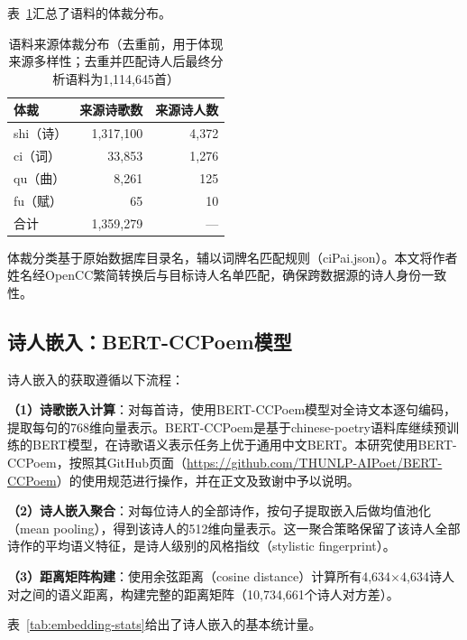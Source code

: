 \documentclass[12pt,a4paper]{article}
\numberwithin{equation}{section}
\begin{document}
表~\ref{tab:corpus}汇总了语料的体裁分布。

\begin{table}[htbp]
  \centering
  \caption{语料来源体裁分布（去重前，用于体现来源多样性；去重并匹配诗人后最终分析语料为1,114,645首）}
  \label{tab:corpus}
  \begin{tabular}{lrr}
    \toprule
    体裁 & 来源诗歌数 & 来源诗人数 \\
    \midrule
    shi（诗）   & 1,317,100 & 4,372 \\
    ci（词）   &    33,853 & 1,276 \\
    qu（曲）   &     8,261 &   125 \\
    fu（赋）   &        65 &    10 \\
    \midrule
    合计       & 1,359,279 & — \\
    \bottomrule
  \end{tabular}
\end{table}

体裁分类基于原始数据库目录名，辅以词牌名匹配规则（ciPai.json）。本文将作者姓名经OpenCC繁简转换后与目标诗人名单匹配，确保跨数据源的诗人身份一致性。

\subsection{诗人嵌入：BERT-CCPoem模型}

诗人嵌入的获取遵循以下流程：

\textbf{（1）诗歌嵌入计算}：对每首诗，使用BERT-CCPoem模型对全诗文本逐句编码，提取每句的768维向量表示。BERT-CCPoem是基于chinese-poetry语料库继续预训练的BERT模型，在诗歌语义表示任务上优于通用中文BERT。本研究使用BERT-CCPoem，按照其GitHub页面（\url{https://github.com/THUNLP-AIPoet/BERT-CCPoem}）的使用规范进行操作，并在正文及致谢中予以说明。

\textbf{（2）诗人嵌入聚合}：对每位诗人的全部诗作，按句子提取嵌入后做均值池化（mean pooling），得到该诗人的512维向量表示。这一聚合策略保留了该诗人全部诗作的平均语义特征，是诗人级别的风格指纹（stylistic fingerprint）。

\textbf{（3）距离矩阵构建}：使用余弦距离（cosine distance）计算所有4,634$\times$4,634诗人对之间的语义距离，构建完整的距离矩阵（10,734,661个诗人对方差）。

表~\ref{tab:embedding-stats}给出了诗人嵌入的基本统计量。
\end{document}
